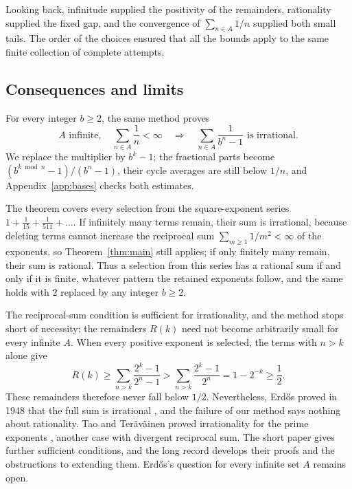 \documentclass[10pt]{article}
\theoremstyle{plain}
\theoremstyle{definition}
\theoremstyle{remark}
\begin{document}
Looking back, infinitude supplied the positivity of the remainders,
rationality supplied the fixed gap, and the convergence of
$\sum_{n\in A}1/n$ supplied both small tails. The order of the choices
ensured that all the bounds apply to the same finite collection of
complete attempts.

\begin{samepage}
\section{Consequences and limits}\label{sec:limits}

For every integer $b\ge2$, the same method proves
\[
 A\text{ infinite},\quad\sum_{n\in A}\frac1n<\infty
 \quad\Longrightarrow\quad
 \sum_{n\in A}\frac1{b^n-1}\text{ is irrational}.
\]
We replace the multiplier by $b^k-1$; the fractional parts become
$(b^{k\bmod n}-1)/(b^n-1)$, their cycle averages are still below $1/n$,
and Appendix~\ref{app:bases} checks both estimates.
\end{samepage}

The theorem covers every selection from the square-exponent series
$1+\tfrac1{15}+\tfrac1{511}+\dots$. If infinitely many terms remain,
their sum is irrational, because deleting terms cannot increase the
reciprocal sum $\sum_{m\ge1}1/m^2<\infty$ of the exponents, so
Theorem~\ref{thm:main} still applies; if only finitely many remain,
their sum is rational. Thus a selection from this series has a rational
sum if and only if it is finite, whatever pattern the retained exponents
follow, and the same holds with $2$ replaced by any integer $b\ge2$.

The reciprocal-sum condition is sufficient for irrationality, and the
method stops short of necessity: the remainders $R(k)$ need not become
arbitrarily small for every infinite $A$. When every positive exponent
is selected, the terms with $n>k$ alone give
\[
 R(k)\ge\sum_{n>k}\frac{2^k-1}{2^n-1}
 >\sum_{n>k}\frac{2^k-1}{2^n}
 =1-2^{-k}\ge\frac12.
\]
These remainders therefore never fall below $1/2$. Nevertheless,
Erd\H{o}s proved in
1948 that the full sum is irrational \cite{erdos1948}, and the failure
of our method says nothing about rationality. Tao and Ter\"av\"ainen
proved irrationality for the prime exponents
\cite[Theorem~1.3]{taoteravainen2025}, another case with divergent
reciprocal sum. The short paper \cite{shortpaper} gives further
sufficient conditions, and the long record \cite{longrecord} develops
their proofs and the obstructions to extending them. Erd\H{o}s's
question for every infinite set $A$ remains open.
\end{document}
